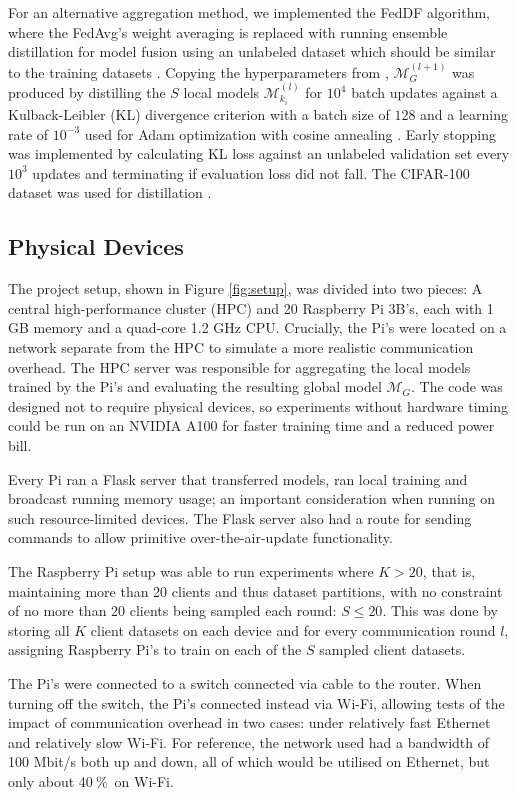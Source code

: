 \documentclass{article}
\newcommand{\unit}[1]{\ensuremath{\:\text{#1}}}
\newcommand{\pro}{\ensuremath{\unit{\%{}}}}
\begin{document}
For an alternative aggregation method, we implemented the FedDF algorithm, where the FedAvg's weight averaging is replaced with running ensemble distillation for model fusion using an unlabeled dataset which should be similar to the training datasets \cite{lin2020ensemble}.
Copying the hyperparameters from \cite{lin2020ensemble}, $\mathcal M_G^{(l + 1)}$ was produced by distilling the $S$ local models $\mathcal M_{k_i}^{(l)}$ for $10^4$ batch updates against a Kulback-Leibler (KL) divergence criterion with a batch size of $128$ and a learning rate of $10^{-3}$ used for Adam optimization with cosine annealing \cite{losh2016sgdr,kingma2015adam}.
Early stopping was implemented by calculating KL loss against an unlabeled validation set every $10^3$ updates and terminating if evaluation loss did not fall.
The CIFAR-100 dataset was used for distillation \cite{alex2009learning}.

\subsection{Physical Devices}
The project setup, shown in Figure \ref{fig:setup}, was divided into two pieces: A central high-performance cluster (HPC) and 20 Raspberry Pi 3B's, each with 1 GB memory and a quad-core 1.2 GHz CPU.
Crucially, the Pi's were located on a network separate from the HPC to simulate a more realistic communication overhead.
The HPC server was responsible for aggregating the local models trained by the Pi's and evaluating the resulting global model $\mathcal M_G$.
The code was designed not to require physical devices, so experiments without hardware timing could be run on an NVIDIA A100 for faster training time and a reduced power bill.

Every Pi ran a Flask server that transferred models, ran local training and broadcast running memory usage; an important consideration when running on such resource-limited devices.
The Flask server also had a route for sending commands to allow primitive over-the-air-update functionality.

The Raspberry Pi setup was able to run experiments where $K > 20$, that is, maintaining more than 20 clients and thus dataset partitions, with no constraint of no more than 20 clients being sampled each round: $S \leq 20$.
This was done by storing all $K$ client datasets on each device and for every communication round $l$, assigning Raspberry Pi's to train on each of the $S$ sampled client datasets.

The Pi's were connected to a switch connected via cable to the router.
When turning off the switch, the Pi's connected instead via Wi-Fi, allowing tests of the impact of communication overhead in two cases: under relatively fast Ethernet and relatively slow Wi-Fi.
For reference, the network used had a bandwidth of 100 Mbit/s both up and down, all of which would be utilised on Ethernet, but only about 40\pro\ on Wi-Fi.
\end{document}
